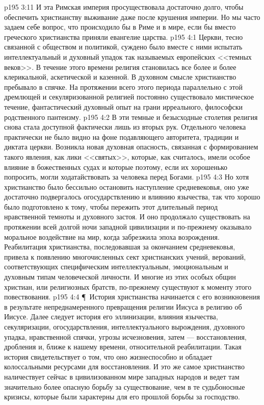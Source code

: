 \vs p195 3:11 И эта Римская империя просуществовала достаточно долго, чтобы обеспечить христианству выживание даже после крушения империи. Но мы часто задаем себе вопрос, что происходило бы в Риме и в мире, если бы вместо греческого христианства приняли евангелие царства.
\vs p195 4:1 Церкви, тесно связанной с обществом и политикой, суждено было вместе с ними испытать интеллектуальный и духовный упадок так называемых европейских <<темных веков>>. В течение этого времени религия становилась все более и более клерикальной, аскетической и казенной. В духовном смысле христианство пребывало в спячке. На протяжении всего этого периода параллельно с этой дремлющей и секуляризованной религией постоянно существовало мистическое течение, фантастический духовный опыт на грани ирреального, философски родственного пантеизму.
\vs p195 4:2 В эти темные и безысходные столетия религия снова стала доступной фактически лишь из вторых рук. Отдельного человека практически не было видно на фоне подавляющего авторитета, традиции и диктата церкви. Возникла новая духовная опасность, связанная с формированием такого явления, как лики <<святых>>, которые, как считалось, имели особое влияние в божественных судах и которые поэтому, если их хорошенько попросить, могли ходатайствовать за человека перед Богами.
\vs p195 4:3 Но хотя христианство было бессильно остановить наступление средневековья, оно уже достаточно подвергалось огосударствлению и влиянию язычества, так что хорошо было подготовлено к тому, чтобы пережить этот длительный период нравственной темноты и духовного застоя. И оно продолжало существовать на протяжении всей долгой ночи западной цивилизации и по\hyp{}прежнему оказывало моральное воздействие на мир, когда забрезжила эпоха возрождения. Реабилитация христианства, последовавшая за окончанием средневековья, привела к появлению многочисленных сект христианских учений, верований, соответствующих специфическим интеллектуальным, эмоциональным и духовным типам человеческой личности. И многие из этих особых общин христиан, или религиозных братств, по\hyp{}прежнему существуют к моменту этого повествования.
\vs p195 4:4 \P\ История христианства начинается с его возникновения в результате непреднамеренного превращения религии Иисуса в религию об Иисусе. Далее следует история его эллинизации, влияния язычества, секуляризации, огосударствления, интеллектуального вырождения, духовного упадка, нравственной спячки, угрозы исчезновения, затем --- восстановления, дробления и, ближе к нашему времени, относительной реабилитации. Такая история свидетельствует о том, что оно жизнеспособно и обладает колоссальными ресурсами для восстановления. И это же самое христианство наличествует сейчас в цивилизованном мире западных народов и ведет там значительно более опасную борьбу за существование, чем в те судьбоносные кризисы, которые были характерны для его прошлой борьбы за господство.
